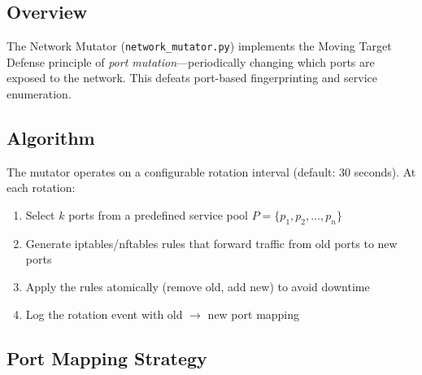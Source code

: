 \documentclass[12pt,a4paper]{article}
\begin{document}
\subsection{Overview}

The Network Mutator (\texttt{network\_mutator.py}) implements the Moving Target Defense principle of \emph{port mutation}---periodically changing which ports are exposed to the network. This defeats port-based fingerprinting and service enumeration.

\subsection{Algorithm}

The mutator operates on a configurable rotation interval (default: 30 seconds). At each rotation:

\begin{enumerate}[leftmargin=*, itemsep=3pt]
    \item Select $k$ ports from a predefined service pool $P = \{p_1, p_2, \ldots, p_n\}$
    \item Generate iptables/nftables rules that forward traffic from old ports to new ports
    \item Apply the rules atomically (remove old, add new) to avoid downtime
    \item Log the rotation event with old $\to$ new port mapping
\end{enumerate}

\subsection{Port Mapping Strategy}
\end{document}
